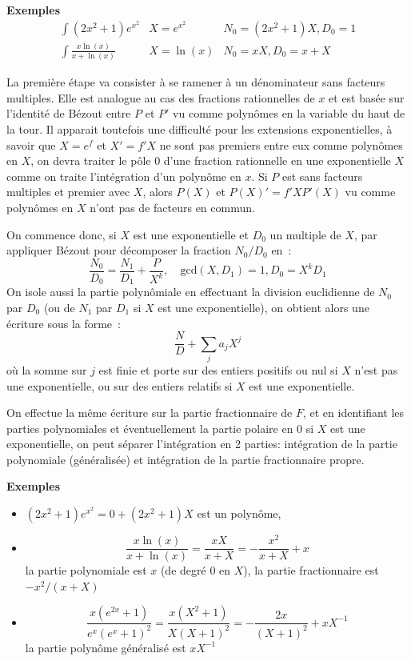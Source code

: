 \documentclass[a4paper,11pt]{article}
\begin{document}
{\bf Exemples}\\
\begin{eqnarray*}
\int (2x^2+1) e^{x^2} & X=e^{x^2} & N_0=(2x^2+1) X, D_0=1 \\
\int \frac{x \ln(x)}{x+\ln(x)} & X=\ln(x) & N_0=xX, D_0=x+X
\end{eqnarray*}

La première étape va consister à se ramener à un dénominateur sans facteurs
multiples. Elle est analogue au cas des fractions
rationnelles de $x$ et est basée sur l'identité de Bézout entre
$P$ et $P'$ vu comme polynômes en la variable du haut de la tour. 
Il apparait toutefois une difficulté pour les
extensions exponentielles, à savoir que $X=e^f$ et $X'=f' X$
ne sont pas premiers entre eux comme polynômes en $X$, on devra
traiter le pôle 0 d'une fraction rationnelle en une exponentielle $X$ comme
on traite l'intégration d'un polynôme en $x$.
Si $P$ est sans facteurs multiples et premier avec $X$, alors
$P(X)$ et $P(X)'=f' X P'(X)$ vu comme
polynômes en $X$ n'ont pas de facteurs en commun.

On commence donc, si $X$ est une exponentielle et $D_0$ un
multiple de $X$, par appliquer Bézout pour décomposer la fraction $N_0/D_0$
en~:
\[ \frac{N_0}{D_0}
=\frac{N_1}{D_1} + \frac{P}{X^{k} } , \quad \mbox{gcd}(X,D_1)=1, D_0=X^k D_1\]
On isole aussi la partie polynômiale en effectuant
la division euclidienne de $N_0$ par $D_0$ (ou de $N_1$ par $D_1$ si $X$
est une exponentielle),
on obtient alors une écriture sous la forme~:
\[ \frac{N}{D} + \sum_j a_j X^j\]
où la somme sur $j$ est finie et porte sur des entiers positifs ou nul 
si $X$ n'est pas une exponentielle, ou sur des entiers relatifs si $X$
est une exponentielle.

On effectue la même écriture sur la partie fractionnaire de $F$,
et en identifiant les parties polynomiales et éventuellement la partie
polaire en 0 si $X$ est une exponentielle, on peut séparer l'intégration
en 2 parties: intégration de la partie polynomiale (généralisée)
et intégration de la partie fractionnaire propre.

{\bf Exemples}
\begin{itemize}
\item $ (2x^2+1) e^{x^2} = 0+(2x^2+1)X$ est un polynôme,
\item 
\[ \frac{x \ln(x)}{x+\ln(x)} = \frac{xX}{x+X}=-\frac{x^2}{x+X}+x\]
la partie polynomiale est $x$ (de degré 0 en $X$), la partie fractionnaire
est $-x^2/(x+X)$
\item 
\[ \frac{x(e^{2x}+1)}{e^x(e^x+1)^2}=\frac{x(X^2+1)}{X(X+1)^2}
= -\frac{2x}{(X+1)^2} + xX^{-1}\]
la partie polynôme généralisé est $xX^{-1}$
\end{itemize}
\end{document}
